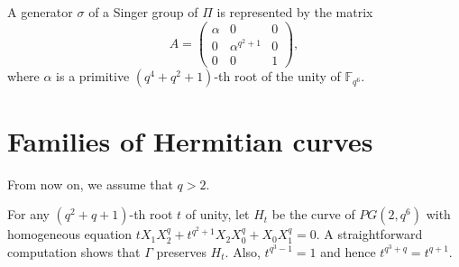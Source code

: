 \documentclass[9pt]{article}
\theoremstyle{plain}
\begin{document}
A generator $\sigma$ of a Singer group of $\Pi$ is represented by the matrix
\[A=\left(\begin{array}{ccc}
\alpha   & 0& 0\\
0& \alpha^{q^2+1}&0\\
0 & 0&1
\end{array}\right),\]
where $\alpha$ is a primitive $(q^4+q^2+1)$-th root of the unity of $\mathbb{F}_{q^6}$.
\section{Families of Hermitian curves}
From now on, we assume that $q>2$.

For any $(q^2+q+1)$-th root $t$ of unity, let $H_t$ be the curve of $PG(2,q^6)$ with homogeneous equation $tX_1X_2^q+t^{q^2+1}X_2X_0^q+X_0X_1^q=0$.  A straightforward computation shows that $\Gamma$ preserves $H_t$.
Also, $t^{q^3-1}=1$ and hence $t^{q^3+q}=t^{q+1}$. 
\end{document}
